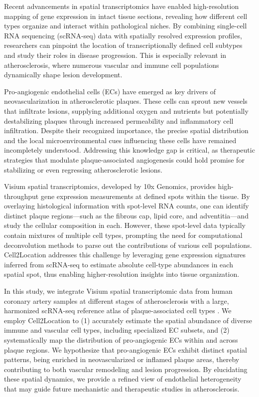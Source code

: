 \documentclass[a4paper,12pt]{article}
\begin{document}
Recent advancements in spatial transcriptomics have enabled high-resolution mapping of gene expression in intact tissue sections, revealing how different cell types organize and interact within pathological niches. By combining single-cell RNA sequencing (scRNA-seq) data with spatially resolved expression profiles, researchers can pinpoint the location of transcriptionally defined cell subtypes and study their roles in disease progression. This is especially relevant in atherosclerosis, where numerous vascular and immune cell populations dynamically shape lesion development.

Pro-angiogenic endothelial cells (ECs) have emerged as key drivers of neovascularization in atherosclerotic plaques. These cells can sprout new vessels that infiltrate lesions, supplying additional oxygen and nutrients but potentially destabilizing plaques through increased permeability and inflammatory cell infiltration. Despite their recognized importance, the precise spatial distribution and the local microenvironmental cues influencing these cells have remained incompletely understood. Addressing this knowledge gap is critical, as therapeutic strategies that modulate plaque-associated angiogenesis could hold promise for stabilizing or even regressing atherosclerotic lesions.

Visium spatial transcriptomics, developed by 10x Genomics, provides high-throughput gene expression measurements at defined spots within the tissue. By overlaying histological information with spot-level RNA counts, one can identify distinct plaque regions—such as the fibrous cap, lipid core, and adventitia—and study the cellular composition in each. However, these spot-level data typically contain mixtures of multiple cell types, prompting the need for computational deconvolution methods to parse out the contributions of various cell populations. Cell2Location \citep{Kleshchevnikov2022-vd} addresses this challenge by leveraging gene expression signatures inferred from scRNA-seq to estimate absolute cell-type abundances in each spatial spot, thus enabling higher-resolution insights into tissue organization.

In this study, we integrate Visium spatial transcriptomic data from human coronary artery samples at different stages of atherosclerosis with a large, harmonized scRNA-seq reference atlas of plaque-associated cell types \citep{Traeuble2024-de}. We employ Cell2Location to (1) accurately estimate the spatial abundance of diverse immune and vascular cell types, including specialized EC subsets, and (2) systematically map the distribution of pro-angiogenic ECs within and across plaque regions. We hypothesize that pro-angiogenic ECs exhibit distinct spatial patterns, being enriched in neovascularized or inflamed plaque areas, thereby contributing to both vascular remodeling and lesion progression. By elucidating these spatial dynamics, we provide a refined view of endothelial heterogeneity that may guide future mechanistic and therapeutic studies in atherosclerosis.
\end{document}
